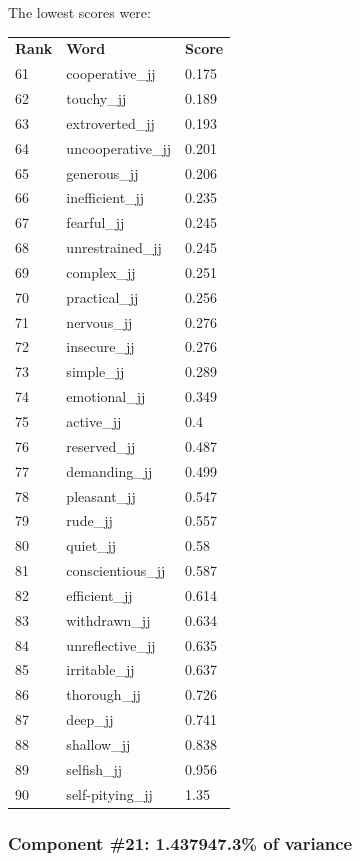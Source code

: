 \documentclass[10pt,letterpaper]{book}
\begin{document}
The lowest scores were:
\begin{tabular}{ l l l }
        \textbf{Rank} & \textbf{Word} & \textbf{Score} \\
        61 & cooperative\_jj & 0.175 \\
        62 & touchy\_jj & 0.189 \\
        63 & extroverted\_jj & 0.193 \\
        64 & uncooperative\_jj & 0.201 \\
        65 & generous\_jj & 0.206 \\
        66 & inefficient\_jj & 0.235 \\
        67 & fearful\_jj & 0.245 \\
        68 & unrestrained\_jj & 0.245 \\
        69 & complex\_jj & 0.251 \\
        70 & practical\_jj & 0.256 \\
        71 & nervous\_jj & 0.276 \\
        72 & insecure\_jj & 0.276 \\
        73 & simple\_jj & 0.289 \\
        74 & emotional\_jj & 0.349 \\
        75 & active\_jj & 0.4 \\
        76 & reserved\_jj & 0.487 \\
        77 & demanding\_jj & 0.499 \\
        78 & pleasant\_jj & 0.547 \\
        79 & rude\_jj & 0.557 \\
        80 & quiet\_jj & 0.58 \\
        81 & conscientious\_jj & 0.587 \\
        82 & efficient\_jj & 0.614 \\
        83 & withdrawn\_jj & 0.634 \\
        84 & unreflective\_jj & 0.635 \\
        85 & irritable\_jj & 0.637 \\
        86 & thorough\_jj & 0.726 \\
        87 & deep\_jj & 0.741 \\
        88 & shallow\_jj & 0.838 \\
        89 & selfish\_jj & 0.956 \\
        90 & self-pitying\_jj & 1.35 \\
\end{tabular}
\subsubsection{Component \#21: 1.437947.3\% of variance}
\end{document}
